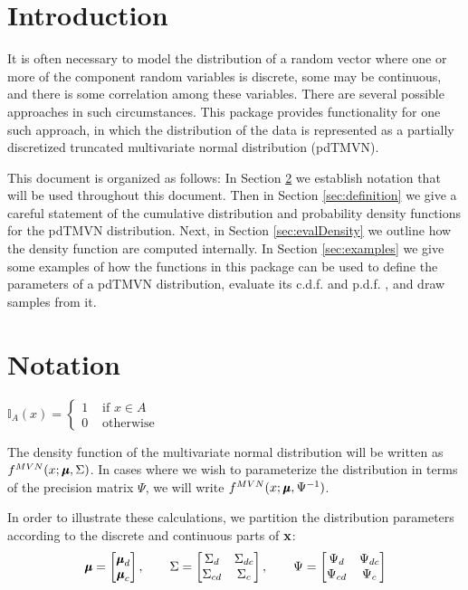 \documentclass[fleqn]{article}
\newcommand{\cdf}{{c.d.f.} }
\newcommand{\pdf}{{p.d.f.} }
\newcommand{\ind}{\mathbb{I}}
\begin{document}


\section{Introduction}
\label{sec:intro}

It is often necessary to model the distribution of a random vector where one or more of the component random variables is discrete, some may be continuous, and there is some correlation among these variables.  There are several possible approaches in such circumstances.  This package provides functionality for one such approach, in which the distribution of the data is represented as a partially discretized truncated multivariate normal distribution (pdTMVN).

This document is organized as follows: In Section \ref{sec:notation} we establish notation that will be used throughout this document.  Then in Section \ref{sec:definition} we give a careful statement of the cumulative distribution and probability density functions for the pdTMVN distribution.  Next, in Section \ref{sec:evalDensity} we outline how the density function are computed internally.  In Section \ref{sec:examples} we give some examples of how the functions in this package can be used to define the parameters of a pdTMVN distribution, evaluate its \cdf and \pdf, and draw samples from it.

\section{Notation}
\label{sec:notation}

$\ind_{A}(x) = \begin{cases} 1 & \text{ if $x \in A$} \\
0 & \text{ otherwise}
\end{cases}$

The density function of the multivariate normal distribution will be written as $f^{MVN}(x ; \bmu, \Sigma)$.  In cases where we wish to parameterize the distribution in terms of the precision matrix $\Psi$, we will write $f^{MVN}(x ; \bmu, \Psi^{-1})$.

In order to illustrate these calculations, we partition the distribution parameters according to the discrete and continuous parts of ${\bf x}$:
\begin{equation*}
\bmu = \begin{bmatrix}
\bmu_d \\ \bmu_c
\end{bmatrix}, \qquad \Sigma = \begin{bmatrix}
\Sigma_d & \Sigma_{dc} \\
\Sigma_{cd} & \Sigma_{c}
\end{bmatrix}, \qquad \Psi = \begin{bmatrix}
\Psi_{d} & \Psi_{dc} \\
\Psi_{cd} & \Psi_{c}
\end{bmatrix}
\end{equation*}
\end{document}
